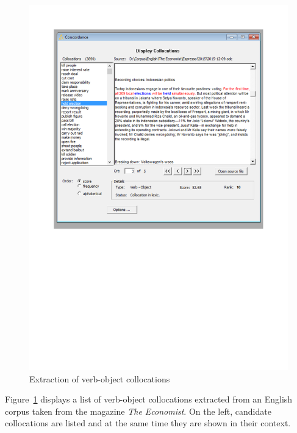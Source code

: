 \documentclass[output=paper]{langsci/langscibook}
\begin{document}
\begin{figure}[htbp]
      \includegraphics[scale=0.7, clip, trim=20mm 110mm 20mm 20mm]{figures/FipsCoPict.pdf}
\caption{\label{figFips}Extraction of verb-object collocations}
\end{figure}


Figure~\ref{figFips} displays a list of verb-object collocations extracted from an English corpus taken from the magazine \textit{The Economist}. On the left, candidate collocations are listed and at the same time they are shown in their context.
          
\end{document}

